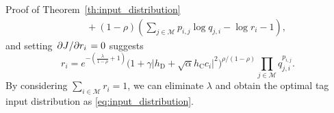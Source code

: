 \documentclass[journal]{IEEEtran}
\begin{document}
\begin{appendix}
\begin{subsection}{Proof of Theorem~\ref{th:input_distribution}}
\begin{align}
				& \quad + (1 - \rho) \left( \sum_{j \in \mathcal{M}} p_{i, j} \log q_{j, i} - \log r_i - 1 \right),
			\end{align}
			and setting $\pdv*{J}{r_i} = 0$ suggests
			\begin{equation}
				r_i = e^{ -(\frac{\lambda}{1 - \rho} + 1)} \bigl( 1 + \gamma \lvert h_{\mathrm{D}} + \sqrt{\alpha} h_{\mathrm{C}} c_i \rvert^2 \bigr)^{\rho / (1 - \rho)} \prod_{j \in \mathcal{M}} q_{j, i}^{p_{i, j}}.
			\end{equation}
			By considering $\sum_{i \in \mathcal{M}} r_i = 1$, we can eliminate $\lambda$ and obtain the optimal tag input distribution as \eqref{eq:input_distribution}.
			\label{ap:input_distribution}
		\end{subsection}
	\end{appendix}

	
	
\end{document}
